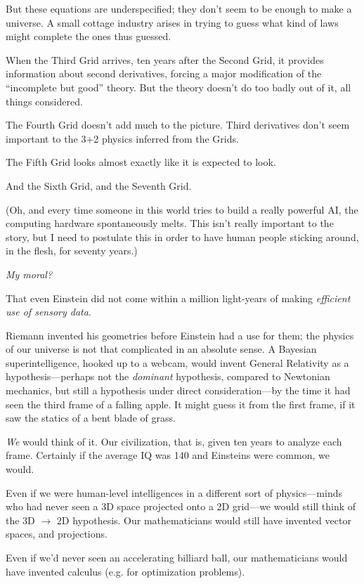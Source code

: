 {
 But these equations are underspecified; they don't
seem to be enough to make a universe. A small cottage industry arises
in trying to guess what kind of laws might complete the ones thus
guessed.}

{
 When the Third Grid arrives, ten years after the Second Grid, it
provides information about second derivatives, forcing a major
modification of the ``incomplete but
good'' theory. But the theory doesn't
do too badly out of it, all things considered.}

{
 The Fourth Grid doesn't add much to the picture.
Third derivatives don't seem important to the 3+2
physics inferred from the Grids.}

{
 The Fifth Grid looks almost exactly like it is expected to look.}

{
 And the Sixth Grid, and the Seventh Grid.}

{
 (Oh, and every time someone in this world tries to build a really
powerful AI, the computing hardware spontaneously melts. This
isn't really important to the story, but I need to
postulate this in order to have human people sticking around, in the
flesh, for seventy years.)}

{
 \textit{My moral?}}

{
 That even Einstein did not come within a million light-years of
making \textit{efficient use of sensory data}.}

{
 Riemann invented his geometries before Einstein had a use for
them; the physics of our universe is not that complicated in an
absolute sense. A Bayesian superintelligence, hooked up to a webcam,
would invent General Relativity as a hypothesis---perhaps not the
\textit{dominant} hypothesis, compared to Newtonian mechanics, but
still a hypothesis under direct consideration---by the time it had seen
the third frame of a falling apple. It might guess it from the first
frame, if it saw the statics of a bent blade of grass.}

{
 \textit{We} would think of it. Our civilization, that is, given
ten years to analyze each frame. Certainly if the average IQ was 140
and Einsteins were common, we would.}

{
 Even if we were human-level intelligences in a different sort of
physics---minds who had never seen a 3D space projected onto a 2D
grid---we would still think of the 3D $\rightarrow $ 2D hypothesis. Our
mathematicians would still have invented vector spaces, and
projections.}

{
 Even if we'd never seen an accelerating billiard
ball, our mathematicians would have invented calculus (e.g. for
optimization problems).}

